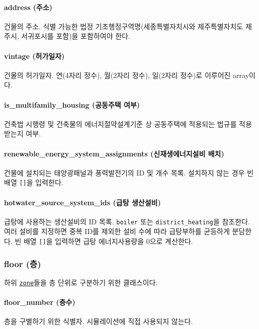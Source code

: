 \paragraph{address (주소)} 건물의 주소. 식별 가능한 법정 기초행정구역명(세종특별자치시와 제주특별자치도 제주시, 서귀포시를 포함)을 포함하여야 한다. 

\paragraph{vintage (허가일자)} 건물의 허가일자. 연(4자리 정수), 월(2자리 정수), 일(2자리 정수)로 이루어진 array이다.

\paragraph{is\_multifamily\_housing (공동주택 여부)} 건축법 시행령 및 건축물의 에너지절약설계기준 상 공동주택에 적용되는 법규를 적용받는지 여부.

\paragraph{renewable\_energy\_system\_assignments (신재생에너지설비 배치)} 건물에 설치되는 태양광패널과 풍력발전기의 ID 및 개수 목록. 설치하지 않는 경우 빈 배열 \texttt{[]}을 입력한다.

\paragraph{hotwater\_source\_system\_ids (급탕 생산설비)} 급탕에 사용하는 생산설비의 ID 목록. \texttt{boiler} 또는 \texttt{district\_heating}을 참조한다. 여러 설비를 지정하면 중복 ID를 제외한 설비 수에 따라 급탕부하를 균등하게 분담한다. 빈 배열 \texttt{[]}을 입력하면 급탕 에너지사용량을 0으로 계산한다.

\subsubsection{floor (층)} \label{subsubsection:ioref:floor}
하위 \hyperref[subsubsection:ioref:zone]{\texttt{zone}}들을 층 단위로 구분하기 위한 클래스이다.

\jsontable{floor}{
  \jsontablerow{floor_number}{\TypeTag{I}}{\ReqTag{O}}{null}{}{}{}
  \jsontablerow{zones}{[ \hyperref[subsubsection:ioref:zone]{\texttt{zone}} ]}{\ReqTag{R}}{}{}{[1,$Inf$)}{}
}

\paragraph{floor\_number (층수)} 층을 구별하기 위한 식별자. 시뮬레이션에 직접 사용되지 않는다.

